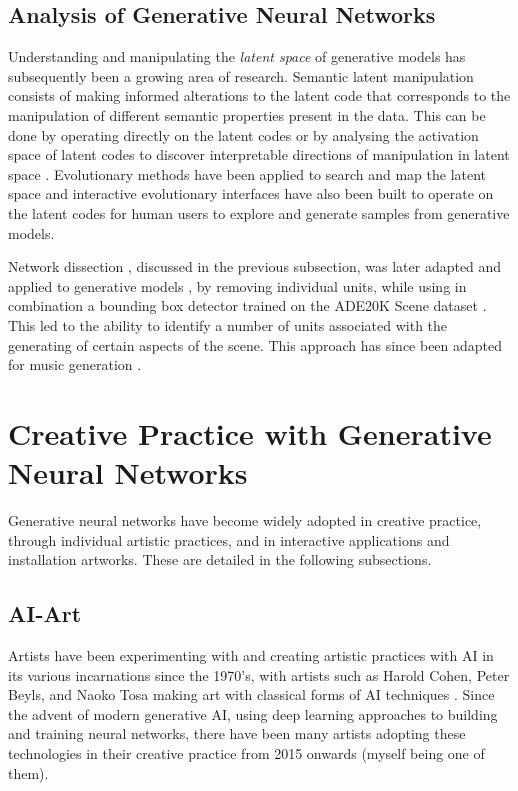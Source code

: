 \subsection{Analysis of Generative Neural Networks}

Understanding and manipulating the \emph{latent space} of generative models has subsequently been a growing area of research. 
Semantic latent manipulation consists of making informed alterations to the latent code that corresponds to the manipulation of different semantic properties present in the data. 
This can be done by operating directly on the latent codes \citep{brock2016neural, shen2020interpreting} or by analysing the activation space of latent codes to discover interpretable directions of manipulation in latent space \citep{harkonen2020ganspace}. 
Evolutionary methods have been applied to search and map the latent space \citep{bontrager2018deepmasterprints, fernandes2020evolutionary} and interactive evolutionary interfaces have also been built to operate on the latent codes \citep{Simon-ganbreeder} for human users to explore and generate samples from generative models. 

Network dissection \citep{Bau2018-td}, discussed in the previous subsection, was later adapted and applied to generative models \citep{Bau2018-td}, by removing individual units, while using in combination a bounding box detector trained on the ADE20K Scene dataset \citep{zhou2017scene}. 
This led to the ability to identify a number of units associated with the generating of certain aspects of the scene. 
This approach has since been adapted for music generation \citep{Brink2019-gc}. 

\section{Creative Practice with Generative Neural Networks}

Generative neural networks have become widely adopted in creative practice, through individual artistic practices, and in interactive applications and installation artworks. 
These are detailed in the following subsections.

\subsection{AI-Art} 

Artists have been experimenting with and creating artistic practices with AI in its various incarnations since the 1970's, with artists such as Harold Cohen, Peter Beyls, and Naoko Tosa making art with classical forms of AI techniques \citep{grba2022deep}. 
Since the advent of modern generative AI, using deep learning approaches to building and training neural networks, there have been many artists adopting these technologies in their creative practice from 2015 onwards (myself being one of them). 

